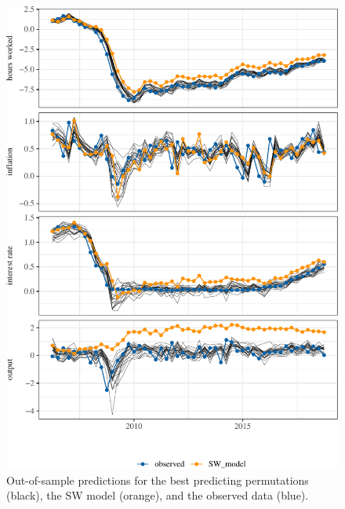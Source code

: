 \documentclass[11pt]{article}
\begin{document}
\begin{figure}[t]

{\centering \includegraphics{gfx/pc-preds-p1-1} 

}

\caption{Out-of-sample predictions for the best predicting permutations (black), the SW model (orange), and the observed data (blue).}\label{fig:pc-preds-p1}
\end{figure}
\end{document}

